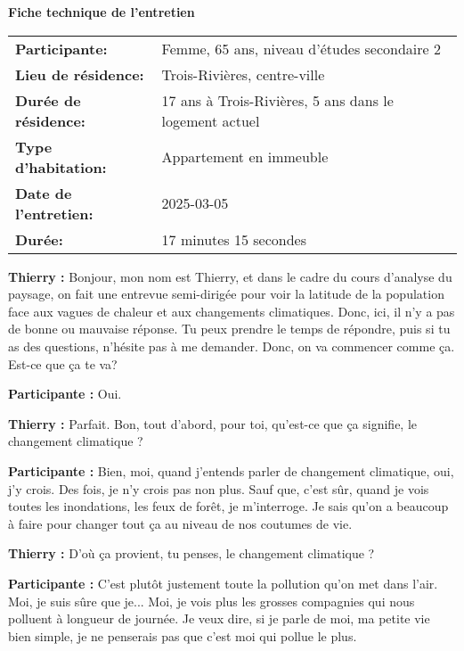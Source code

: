 
\begin{minipage}{\textwidth}
\colorbox{gray!10}{
\begin{minipage}{0.98\textwidth}
\small\textbf{Fiche technique de l'entretien}

\begin{tabular}{ll}
\textbf{Participante:} & Femme, 65 ans, niveau d'études secondaire 2 \\
\textbf{Lieu de résidence:} & Trois-Rivières, centre-ville \\
\textbf{Durée de résidence:} & 17 ans à Trois-Rivières, 5 ans dans le logement actuel \\
\textbf{Type d'habitation:} & Appartement en immeuble \\
\textbf{Date de l'entretien:} & 2025-03-05 \\
\textbf{Durée:} & 17 minutes 15 secondes \\
\end{tabular}
\end{minipage}}
\end{minipage}

\vspace{1em}

\textbf{Thierry :} Bonjour, mon nom est Thierry, et dans le cadre du cours d'analyse du paysage, on fait une entrevue semi-dirigée pour voir la latitude de la population face aux vagues de chaleur et aux changements climatiques. Donc, ici, il n'y a pas de bonne ou mauvaise réponse. Tu peux prendre le temps de répondre, puis si tu as des questions, n'hésite pas à me demander. Donc, on va commencer comme ça. Est-ce que ça te va?

\textbf{Participante :} Oui.

\textbf{Thierry :} Parfait. Bon, tout d'abord, pour toi, qu'est-ce que ça signifie, le changement climatique ?

\textbf{Participante :} Bien, moi, quand j'entends parler de changement climatique, oui, j'y crois. Des fois, je n'y crois pas non plus. Sauf que, c'est sûr, quand je vois toutes les inondations, les feux de forêt, je m'interroge. Je sais qu'on a beaucoup à faire pour changer tout ça au niveau de nos coutumes de vie.

\textbf{Thierry :} D'où ça provient, tu penses, le changement climatique ?

\textbf{Participante :} C'est plutôt justement toute la pollution qu'on met dans l'air. Moi, je suis sûre que je... Moi, je vois plus les grosses compagnies qui nous polluent à longueur de journée. Je veux dire, si je parle de moi, ma petite vie bien simple, je ne penserais pas que c'est moi qui pollue le plus.


